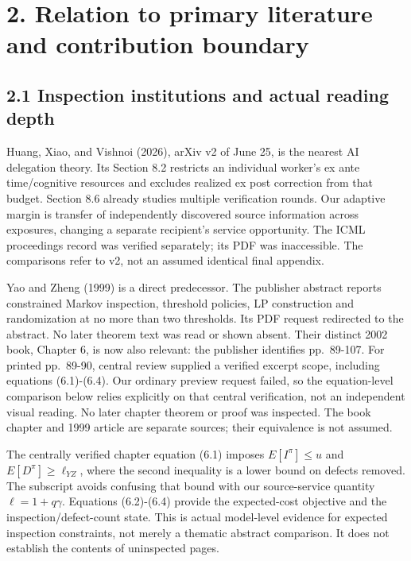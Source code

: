 \documentclass[
  11pt,
  a4paper,
]{article}
\begin{document}
\hypertarget{relation-to-primary-literature-and-contribution-boundary}{%
\section{2. Relation to primary literature and contribution
boundary}\label{relation-to-primary-literature-and-contribution-boundary}}

\hypertarget{inspection-institutions-and-actual-reading-depth}{%
\subsection{2.1 Inspection institutions and actual reading
depth}\label{inspection-institutions-and-actual-reading-depth}}

Huang, Xiao, and Vishnoi (2026), arXiv v2 of June 25, is the nearest AI
delegation theory. Its Section 8.2 restricts an individual worker's ex
ante time/cognitive resources and excludes realized ex post correction
from that budget. Section 8.6 already studies multiple verification
rounds. Our adaptive margin is transfer of independently discovered
source information across exposures, changing a separate recipient's
service opportunity. The ICML proceedings record was verified
separately; its PDF was inaccessible. The comparisons refer to v2, not
an assumed identical final appendix.

Yao and Zheng (1999) is a direct predecessor. The publisher abstract
reports constrained Markov inspection, threshold policies, LP
construction and randomization at no more than two thresholds. Its PDF
request redirected to the abstract. No later theorem text was read or
shown absent. Their distinct 2002 book, Chapter 6, is now also relevant:
the publisher identifies pp.~89-107. For printed pp.~89-90, central
review supplied a verified excerpt scope, including equations
(6.1)-(6.4). Our ordinary preview request failed, so the equation-level
comparison below relies explicitly on that central verification, not an
independent visual reading. No later chapter theorem or proof was
inspected. The book chapter and 1999 article are separate sources; their
equivalence is not assumed.

The centrally verified chapter equation (6.1) imposes \(E[I^\pi]\leq u\)
and \(E[D^\pi]\geq\ell_{YZ}\), where the second inequality is a lower
bound on defects removed. The subscript avoids confusing that bound with
our source-service quantity \(\ell=1+q\gamma\). Equations (6.2)-(6.4)
provide the expected-cost objective and the inspection/defect-count
state. This is actual model-level evidence for expected inspection
constraints, not merely a thematic abstract comparison. It does not
establish the contents of uninspected pages.
\end{document}
